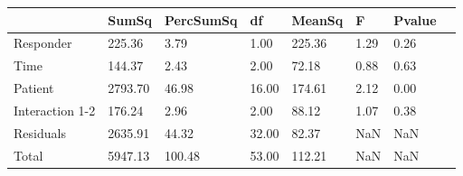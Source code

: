 \begin{tabular}{llllllll}
 & SumSq & PercSumSq & df & MeanSq & F & Pvalue \\ 
 \hline 
Responder & 225.36 & 3.79 & 1.00 & 225.36 & 1.29 & 0.26 \\ 
Time & 144.37 & 2.43 & 2.00 & 72.18 & 0.88 & 0.63 \\ 
Patient & 2793.70 & 46.98 & 16.00 & 174.61 & 2.12 & 0.00 \\ 
Interaction 1-2 & 176.24 & 2.96 & 2.00 & 88.12 & 1.07 & 0.38 \\ 
Residuals & 2635.91 & 44.32 & 32.00 & 82.37 & NaN & NaN \\ 
Total & 5947.13 & 100.48 & 53.00 & 112.21 & NaN & NaN \\ 
\end{tabular} 
